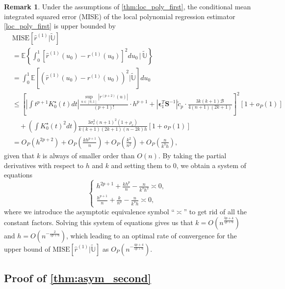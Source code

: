 \documentclass{uwstat572}
\theoremstyle{definition}
\newtheorem{Remark}{Remark}
\renewcommand{\hat}{\widehat}
\renewcommand{\tilde}{\widetilde}
\theoremstyle{theorem}
\begin{document}
\begin{Remark}
\label{remark:MISE_loc_poly}
Under the assumptions of \autoref{thm:loc_poly_first}, the conditional mean integrated squared error (MISE) of the local polynomial regression estimator \eqref{loc_poly_first} is upper bounded by
\begin{align*}
&\mathrm{MISE}\left[\hat{r}^{(1)} \big|\tilde{\mathbb{U}}\right] \\
&= \mathbb{E}\left\{\int_0^1 \left[\hat{r}^{(1)}(u_0) -r^{(1)}(u_0)\right]^2 du_0 \,\Big|\, \tilde{\mathbb{U}}\right\}\\
&= \int_0^1 \mathbb{E}\left[\left(\hat{r}^{(1)}(u_0) -r^{(1)}(u_0)\right)^2 \Big| \tilde{\mathbb{U}} \right] du_0\\
&\leq \left[\left|\int t^{p+1} K_0^{\star}(t) dt\right| \frac{\sup_{u\in [0,1]}\left|r^{(p+2)}(u)\right|}{(p+1)!} \cdot h^{p+1} + \left|\bm{\epsilon}_1^T \bm{S}^{-1} \right| \tilde{c}_p\cdot \frac{3k(k+1) \mathcal{B}}{4(n+1)(2k+1)}\right]^2 \left[1+o_P(1)\right] \\
&\quad + \left(\int K_0^{\star}(t)^2 dt \right) \frac{3\sigma_e^2 (n+1)^2 (1+\rho_c)}{k(k+1)(2k+1) (n-2k) h} \left[1+o_P(1)\right] \\
&= O_P\left(h^{2p+2}\right) + O_P\left(\frac{kh^{p+1}}{n}\right) + O_P\left(\frac{k^2}{n^2}\right) + O_P\left(\frac{n}{k^3h}\right),
\end{align*}
given that $k$ is always of smaller order than $O(n)$. By taking the partial derivatives with respect to $h$ and $k$ and setting them to 0, we obtain a system of equations
\[
\begin{cases}
h^{2p+1} + \frac{kh^p}{n} - \frac{n}{k^3h^2} \asymp 0,\\
\frac{h^{p+1}}{n} + \frac{k}{n^2} - \frac{n}{k^4 h} \asymp 0,
\end{cases}
\]
where we introduce the asymptotic equivalence symbol ``$\asymp$'' to get rid of all the constant factors. Solving this system of equations gives us that $k=O\left(n^{\frac{3p+4}{5p+6}}\right)$ and $h=O\left(n^{-\frac{2}{5p+6}}\right)$, which leading to an optimal rate of convergence for the upper bound of $\mathrm{MISE}\left[\hat{r}^{(1)} \big|\tilde{\mathbb{U}}\right]$ as $O_P\left(n^{-\frac{4p+4}{5p+6}}\right)$.
\end{Remark}

\subsection{Proof of \autoref{thm:asym_second}}
\label{App:proof_thm5}
\end{document}
